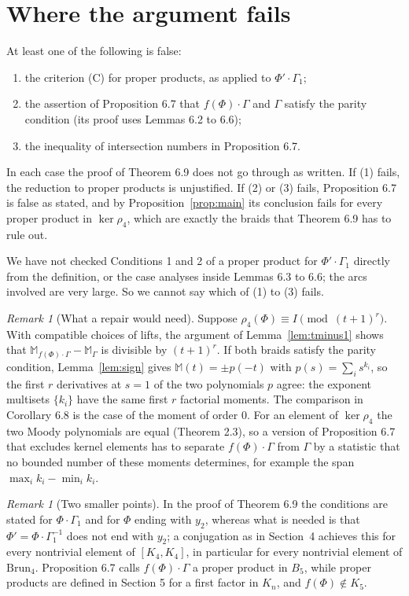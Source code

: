 \documentclass[11pt]{amsart}
\theoremstyle{remark}
\newtheorem{remark}[lemma]{Remark}
\newcommand{\M}{\mathbb{M}}
\newcommand{\Brun}{\mathrm{Brun}}
\begin{document}
\section{Where the argument fails}

At least one of the following is false:
\begin{enumerate}
\item the criterion (C) for proper products, as applied to $\Phi'\cdot\Gamma_1$;
\item the assertion of Proposition 6.7 that $f(\Phi)\cdot\Gamma$ and $\Gamma$ satisfy the parity condition (its proof uses Lemmas 6.2 to 6.6);
\item the inequality of intersection numbers in Proposition 6.7.
\end{enumerate}
In each case the proof of Theorem 6.9 does not go through as written. If (1) fails, the reduction to proper products is unjustified. If (2) or (3) fails, Proposition 6.7 is false as stated, and by Proposition~\ref{prop:main} its conclusion fails for every proper product in $\ker\rho_4$, which are exactly the braids that Theorem 6.9 has to rule out.

We have not checked Conditions 1 and 2 of a proper product for $\Phi'\cdot\Gamma_1$ directly from the definition, or the case analyses inside Lemmas 6.3 to 6.6; the arcs involved are very large. So we cannot say which of (1) to (3) fails.

\begin{remark}[What a repair would need]
Suppose $\rho_4(\Phi)\equiv I\pmod{(t+1)^r}$. With compatible choices of lifts, the argument of Lemma~\ref{lem:tminus1} shows that $\M_{f(\Phi)\cdot\Gamma}-\M_\Gamma$ is divisible by $(t+1)^r$. If both braids satisfy the parity condition, Lemma~\ref{lem:sign} gives $\M(t)=\pm p(-t)$ with $p(s)=\sum_i s^{k_i}$, so the first $r$ derivatives at $s=1$ of the two polynomials $p$ agree: the exponent multisets $\{k_i\}$ have the same first $r$ factorial moments. The comparison in Corollary 6.8 is the case of the moment of order $0$. For an element of $\ker\rho_4$ the two Moody polynomials are equal (Theorem 2.3), so a version of Proposition 6.7 that excludes kernel elements has to separate $f(\Phi)\cdot\Gamma$ from $\Gamma$ by a statistic that no bounded number of these moments determines, for example the span $\max_i k_i-\min_i k_i$.
\end{remark}

\begin{remark}[Two smaller points]
In the proof of Theorem 6.9 the conditions are stated for $\Phi\cdot\Gamma_1$ and for $\Phi$ ending with $y_2$, whereas what is needed is that $\Phi'=\Phi\cdot\Gamma_1^{-1}$ does not end with $y_2$; a conjugation as in Section~4 achieves this for every nontrivial element of $[K_4,K_4]$, in particular for every nontrivial element of $\Brun_4$. Proposition 6.7 calls $f(\Phi)\cdot\Gamma$ a proper product in $B_5$, while proper products are defined in Section 5 for a first factor in $K_n$, and $f(\Phi)\notin K_5$.
\end{remark}
\end{document}
